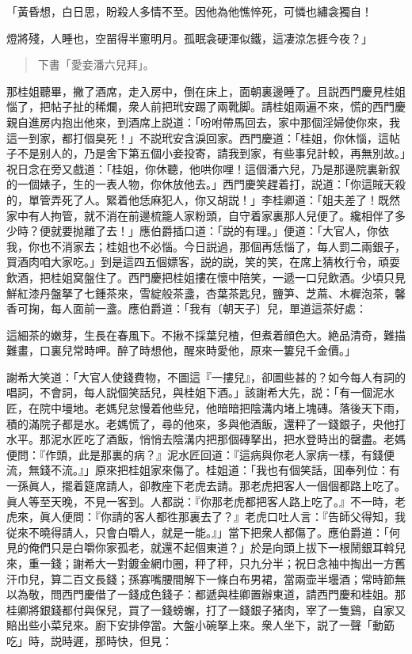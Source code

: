 \begin{myquote}
「黃昏想，白日思，盼殺人多情不至。因他為他憔悴死，可憐也繡衾獨自！

燈將殘，人睡也，空㽞得半窻明月。孤眠衾硬渾似鐵，這凄涼怎捱今夜？」
\end{myquote}

\begin{quotation}
\begin{flushright}
下書「愛妾潘六兒拜」。
\end{flushright}
\end{quotation}

那桂姐聽畢，撇了酒席，走入房中，倒在床上，面朝裏邊睡了。且説西門慶見桂姐惱了，把帖子扯的稀爛，衆人前把玳安踢了兩靴脚。請桂姐兩遍不來，慌的西門慶親自進房内抱出他來，到酒席上説道：「吩咐帶馬回去，家中那個淫婦使你來，我這一到家，都打個臭死！」不説玳安含淚回家。西門慶道：「桂姐，你休惱，這帖子不是别人的，乃是舍下第五個小妾投寄，請我到家，有些事兒計較，再無別故。」祝日念在旁又戲道：「桂姐，你休聽，他哄你哩！這個潘六兒，乃是那邊院裏新叙的一個婊子，生的一表人物，你休放他去。」西門慶笑趕着打，説道：「你這賊天殺的，單管弄死了人。緊着他恁麻犯人，你又胡説！」李桂卿道：「姐夫差了！既然家中有人拘管，就不消在前邊梳籠人家粉頭，自守着家裏那人兒便了。纔相伴了多少時？便就要抛離了去！」應伯爵插口道：「説的有理。」便道：「大官人，你依我，你也不消家去；桂姐也不必惱。今日説過，那個再恁惱了，每人罰二兩銀子，買酒肉咱大家吃。」到是這四五個嫖客，説的説，笑的笑，在席上猜枚行令，頑耍飲酒，把桂姐窝盤住了。西門慶把桂姐摟在懷中陪笑，一遞一口兒飲酒。少頃只見鮮紅漆丹盤拏了七鍾茶來，雪綻般茶盞，杏葉茶匙兒，鹽笋、芝蔴、木樨泡茶，馨香可掬，每人面前一盞。應伯爵道：「我有〔朝天子〕兒，單道這茶好處：

\begin{myquote}
這細茶的嫩芽，生長在春風下。不揪不採葉兒楂，但煮着顔色大。絶品清奇，難描難畫，口裏兒常時呷。醉了時想他，醒來時愛他，原來一簍兒千金價。」
\end{myquote}

謝希大笑道：「大官人使錢費物，不圖這『一摟兒』，卻圖些甚的？如今每人有詞的唱詞，不會詞，每人説個笑話兒，與桂姐下酒。」該謝希大先，説：「有一個泥水匠，在院中墁地。老媽兒怠慢着他些兒，他暗暗把陰溝内堵上塊磚。落後天下雨，積的滿院子都是水。老媽慌了，尋的他來，多與他酒飯，還秤了一錢銀子，央他打水平。那泥水匠吃了酒飯，悄悄去陰溝内把那個磚拏出，把水登時出的罄盡。老媽便問：『作頭，此是那裏的病？』泥水匠回道：『這病與你老人家病一樣，有錢便流，無錢不流。』」原來把桂姐家來傷了。桂姐道：「我也有個笑話，囬奉列位：有一孫眞人，擺着筵席請人，卻教座下老虎去請。那老虎把客人一個個都路上吃了。眞人等至天晚，不見一客到。人都説：『你那老虎都把客人路上吃了。』不一時，老虎來，眞人便問：『你請的客人都徃那裏去了？』老虎口吐人言：『告師父得知，我従來不曉得請人，只會白嚼人，就是一能。』」當下把衆人都傷了。應伯爵道：「何見的俺們只是白嚼你家孤老，就還不起個東道？」於是向頭上拔下一根鬧銀耳斡兒來，重一錢；謝希大一對鍍金網巾圈，秤了秤，只九分半；祝日念袖中掏出一方舊汗巾兒，算二百文長錢；孫寡嘴腰間解下一條白布男裙，當兩壶半壜酒；常時節無以為敬，問西門慶借了一錢成色錢子：都遞與桂卿置辦東道，請西門慶和桂姐。那桂卿將銀錢都付與保兒，買了一錢螃蠏，打了一錢銀子猪肉，宰了一隻鷄，自家又賠出些小菜兒來。廚下安排停當。大盤小碗拏上來。衆人坐下，説了一聲「動筯吃」時，説時遲，那時快，但見：

